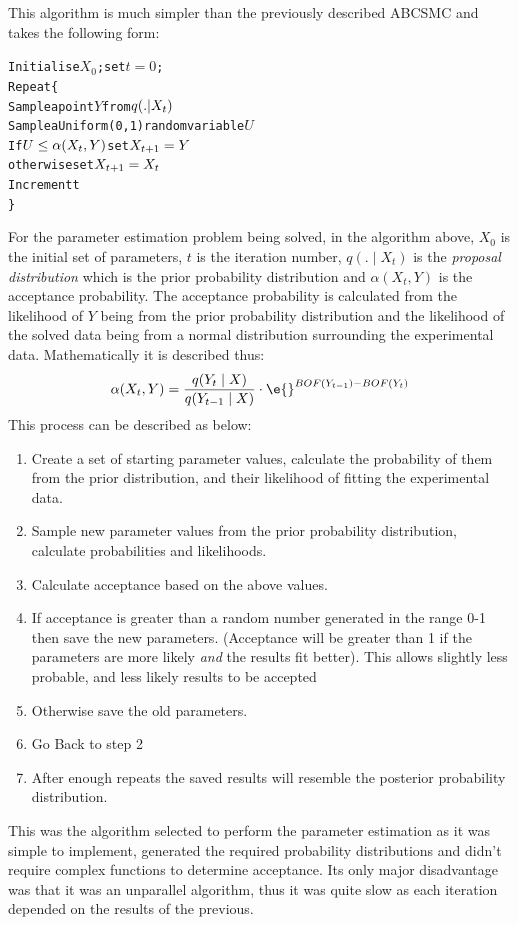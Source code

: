 This algorithm is much simpler than the previously described ABCSMC and takes the following form\cite{Gilks1996}:

\singlespacing %
\begin{alltt}
Initialise \(X_0\); set \(t=0\);
Repeat \{
  Sample a point \(Y\) from \(q(.|X\sb{t})\)
  Sample a Uniform(0,1) random variable \(U\)
  If \(U \leq \alpha(X\sb{t},Y)\) set \(X\sb{t+1}=Y\)
    otherwise set \(X\sb{t+1}=X_t\)
  Increment t
\}
\end{alltt}
\doublespacing %

For the parameter estimation problem being solved, in the algorithm above, $X_0$ is the initial set of parameters, $t$ is the iteration number, $q(.\mid X_t)$ is the \textit{proposal distribution} which is the prior probability distribution and $\alpha(X_t,Y)$ is the acceptance probability. The acceptance probability is calculated from the likelihood of $Y$ being from the prior probability distribution and the likelihood of the solved data being from a normal distribution surrounding the experimental data. Mathematically it is described thus:
\begin{equation*}
\alpha(X_t,Y) = \frac{q(Y_t\mid X)}{q(Y_{t-1}\mid X)}\cdot\e{}^{BOF(Y_{t-1}) - BOF(Y_t)}
\end{equation*}
This process can be described as below:
\begin{enumerate}
\item Create a set of starting parameter values, calculate the probability of them from the prior distribution, and their likelihood of fitting the experimental data.
\item Sample new parameter values from the prior probability distribution, calculate probabilities and likelihoods.
\item Calculate acceptance based on the above values.
\item If acceptance is greater than a random number generated in the range 0-1 then save the new parameters. (Acceptance will be greater than 1 if the parameters are more likely \textit{and} the results fit better). This allows slightly less probable, and less likely results to be accepted
\item Otherwise save the old parameters.
\item Go Back to step 2
\item After enough repeats the saved results will resemble the posterior probability distribution.
\end{enumerate}
This was the algorithm selected to perform the parameter estimation as it was simple to implement, generated the required probability distributions and didn't require complex functions to determine acceptance. Its only major disadvantage was that it was an unparallel algorithm, thus it was quite slow as each iteration depended on the results of the previous.


